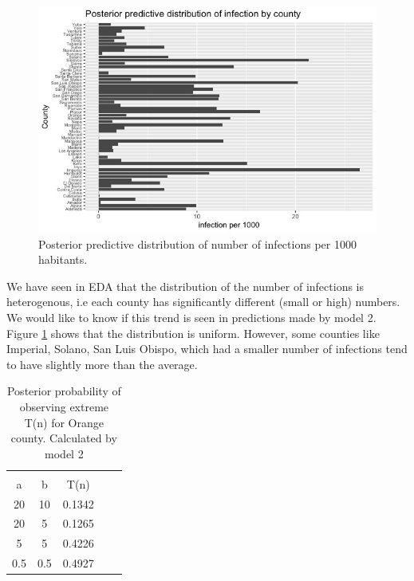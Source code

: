 \documentclass[11pt,twocolumn]{asaproc}
\begin{document}
\begin{figure}[t]
\centering\includegraphics[scale=.30]{infection2.jpeg}
\caption{Posterior predictive distribution of number of infections per 1000 habitants.}
\label{fig:infections}
\end{figure}

We have seen in EDA that the distribution of the number of infections is heterogenous, i.e each county has significantly different (small or high) numbers. We would like to know if this trend is seen in predictions made by model 2. Figure \ref{fig:infections} shows that the distribution is uniform. However, some counties like Imperial, Solano, San Luis Obispo, which had a smaller number of infections tend to have slightly more than the average.

\begin{table}
\caption{Posterior probability of observing extreme T(n) for Orange county. Calculated by model 2}
\label{tab:orange}
\begin{center}
\begin{tabular}{ccccc}
\hline
\hline
\\[-5pt]
\multicolumn{1}{c}{a} &
\multicolumn{1}{c}{b} &
\multicolumn{1}{c}{T(n)}\\
\hline
20&	10&   0.1342\\
20&     5&  0.1265\\
5&	5& 0.4226\\
0.5&     0.5&  0.4927 \\
\hline
\end{tabular}
\end{center}
\end{table}
\end{document}
